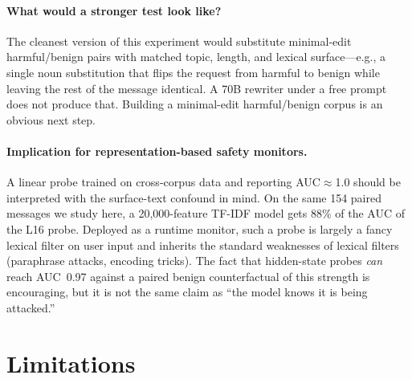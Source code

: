 \documentclass[11pt]{article}
\begin{document}
\paragraph{What would a stronger test look like?}
The cleanest version of this experiment would substitute minimal-edit harmful/benign pairs with matched topic, length, and lexical surface---e.g., a single noun substitution that flips the request from harmful to benign while leaving the rest of the message identical.
A 70B rewriter under a free prompt does not produce that.
Building a minimal-edit harmful/benign corpus is an obvious next step.

\paragraph{Implication for representation-based safety monitors.}
A linear probe trained on cross-corpus data and reporting AUC$\approx$1.0 should be interpreted with the surface-text confound in mind.
On the same 154 paired messages we study here, a 20{,}000-feature TF-IDF model gets 88\% of the AUC of the L16 probe.
Deployed as a runtime monitor, such a probe is largely a fancy lexical filter on user input and inherits the standard weaknesses of lexical filters (paraphrase attacks, encoding tricks).
The fact that hidden-state probes \emph{can} reach AUC~0.97 against a paired benign counterfactual of this strength is encouraging, but it is not the same claim as ``the model knows it is being attacked.''

\section{Limitations}
\label{sec:limitations}
\end{document}
